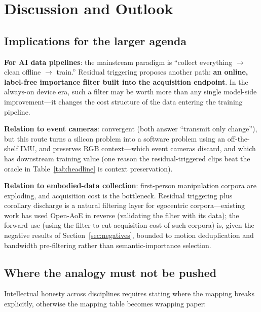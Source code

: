 \documentclass[12pt,a4paper]{article}
\begin{document}
\section{Discussion and Outlook}
\label{sec:discussion}

\subsection{Implications for the larger agenda}

\textbf{For AI data pipelines}: the mainstream paradigm is ``collect everything $\to$ clean offline $\to$ train.'' Residual triggering proposes another path: \textbf{an online, label-free importance filter built into the acquisition endpoint}. In the always-on device era, such a filter may be worth more than any single model-side improvement---it changes the cost structure of the data entering the training pipeline.

\textbf{Relation to event cameras}: convergent (both answer ``transmit only change''), but this route turns a silicon problem into a software problem using an off-the-shelf IMU, and preserves RGB context---which event cameras discard, and which has downstream training value (one reason the residual-triggered clips beat the oracle in Table~\ref{tab:headline} is context preservation).

\textbf{Relation to embodied-data collection}: first-person manipulation corpora are exploding, and acquisition cost is the bottleneck. Residual triggering plus corollary discharge is a natural filtering layer for egocentric corpora---existing work has used Open-AoE in reverse (validating the filter with its data); the forward use (using the filter to cut acquisition cost of such corpora) is, given the negative results of Section~\ref{sec:negatives}, bounded to motion deduplication and bandwidth pre-filtering rather than semantic-importance selection.

\subsection{Where the analogy must not be pushed}

Intellectual honesty across disciplines requires stating where the mapping breaks explicitly, otherwise the mapping table becomes wrapping paper:
\end{document}
